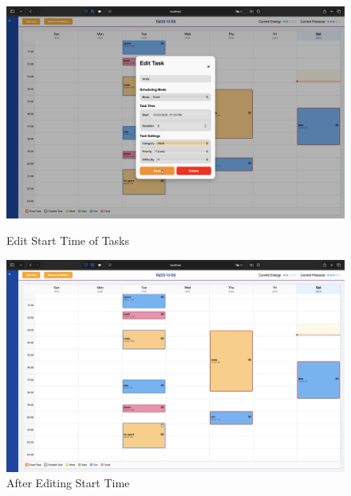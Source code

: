 \documentclass[12pt, a4paper]{article}
\begin{document}
\begin{enumerate}
                    \begin{figure}[H]
                        \begin{minipage}[t]{0.49\textwidth}
                            \centering
                            \includegraphics[width=\textwidth]{Images/System/timetable/change_starttime.png}
                            \caption{Edit Start Time of Tasks}
                            \label{change_starttime}
                        \end{minipage}
                        \hfill
                        \begin{minipage}[t]{0.49\textwidth}
                            \centering
                            \includegraphics[width=\textwidth]{Images/System/timetable/aft_change_starttime.png}
                            \caption{After Editing Start Time}
                            \label{aft_change_starttime}
                        \end{minipage}
                    \end{figure}


\end{enumerate}
\end{document}
